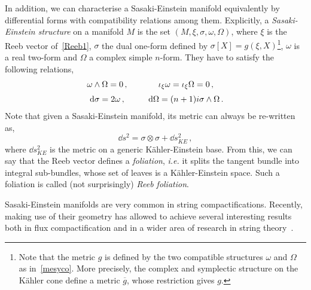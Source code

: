 \documentclass[debug]{phd}
\begin{document}
					
					In addition, we can characterise a Sasaki-Einstein manifold equivalently by differential forms with compatibility relations among them.
					Explicitly, a \emph{Sasaki-Einstein structure} on a manifold $M$ is the set $(M, \xi, \sigma, \omega, \Omega)$, where $\xi$ is the Reeb vector of~\eqref{Reeb1}, $\sigma$ the dual one-form defined by $\sigma\left[X \right] = g(\xi, X)$\footnote{%
						Note that the metric $g$ is defined by the two compatible structures $\omega$ and $\Omega$ as in~\eqref{mesyco}. More precisely, the complex and symplectic structure on the K\"ahler cone define a metric $\overline{g}$, whose restriction gives $g$.%
						},
					$\omega$ is a real two-form and $\Omega$ a complex simple $n$-form.
					They have to satisfy the following relations,
							\begin{equation}
								\begin{array}{c c c}
									\omega \wedge \Omega = 0 \, ,	&	\phantom{\dd}	&\iota_\xi \omega = \iota_\xi \Omega = 0 \, , \\[2mm]
									\dd \sigma = 2 \omega \, ,		&	\phantom{\dd}	&\dd \Omega = (n+1) i \sigma \wedge \Omega \, .
								\end{array}
							\end{equation}
					Note that given a Sasaki-Einstein manifold, its metric can always be re-written as,
							\begin{equation}
								\dd s^2 = \sigma \otimes \sigma + \dd s^2_{KE} \, ,
							\end{equation}
					where $\dd s^2_{KE}$ is the metric on a generic K\"ahler-Einstein base.
					From this, we can say that the Reeb vector defines a \emph{foliation}, \emph{i.e.} it splits the tangent bundle into integral sub-bundles, whose set of leaves is a K\"ahler-Einstein space.
					Such a foliation is called (not surprisingly) \emph{Reeb foliation}.
					
					
Sasaki-Einstein manifolds are very common in string compactifications.
Recently, making use of their geometry has allowed to achieve several interesting results both in flux compactification and in a wider area of research in string theory~\cite{DavideTriSas, DavideSas1, SE1, SE2, SE3, SE4, SE5}.
					
\end{document}
